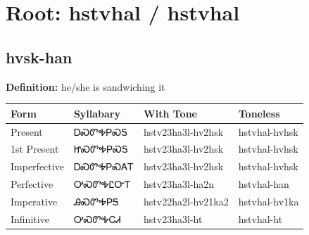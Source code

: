 \documentclass{article}%
\begin{document}
%
\normalsize%
\section*{Root: hstvhal / hstvhal}%
\subsection*{hvsk-han}%
\textbf{Definition: }%
he/she is sandwiching it%
\\[0.5em]%
\begin{tabular}{|l|l|l|l|}%
\hline%
\textbf{Form}&\textbf{Syllabary}&\textbf{With Tone}&\textbf{Toneless}\\%
\hline%
Present&ᎠᏍᏛᎭᏢᏍᎦ&hstv23ha3l{-}hv2hsk&hstvhal{-}hvhsk\\%
1st Present&ᏥᏍᏛᎭᏢᏍᎦ&hstv23ha3l{-}hv2hsk&hstvhal{-}hvhsk\\%
Imperfective&ᎠᏍᏛᎭᏢᏍᎪᎢ&hstv23ha3l{-}hv2hsk&hstvhal{-}hvhsk\\%
Perfective&ᎤᏍᏛᎭᏝᏅᎢ&hstv23ha3l{-}ha2n&hstvhal{-}han\\%
Imperative&ᎯᏍᏛᎭᏢᎦ&hstv22ha2l{-}hv21ka2&hstvhal{-}hv1ka\\%
Infinitive&ᎤᏍᏛᎭᏟᏗ&hstv23ha3l{-}ht&hstvhal{-}ht\\%
\hline%
\end{tabular}%
\\[1em]%
\end{document}
